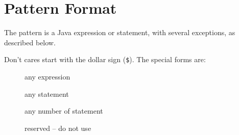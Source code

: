 \documentclass{article}
\begin{document}
\section{Pattern Format}

\label{pattern:format}

The pattern is a Java expression or statement, with several exceptions, as described
below.

Don't cares start with the dollar sign (\verb=$=). The special forms are:
\begin{description}
\item[\simplevariable]{any expression}
\item[\statementvariable]{any statement}
\item[\multiplestatementvariable]{any number of statement}
\item[\reserved]{reserved -- do not use}
\end{description}
\end{document}

